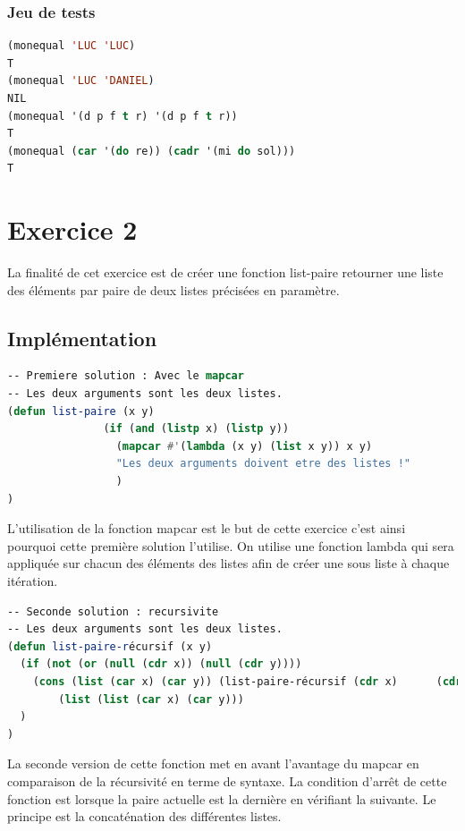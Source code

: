 \documentclass[a4paper,10pt]{report}
\begin{document}
	  \subsection{Jeu de tests}
	  \begin{lstlisting}[language=Lisp]
(monequal 'LUC 'LUC)
T
(monequal 'LUC 'DANIEL)
NIL
(monequal '(d p f t r) '(d p f t r))
T
(monequal (car '(do re)) (cadr '(mi do sol)))
T

		 \end{lstlisting}
	  \chapter{Exercice 2}
	  
	  
	    La finalité de cet exercice est de créer une fonction list-paire retourner une liste des éléments par paire de deux listes précisées en paramètre.
	  \section{Implémentation}
	  \begin{lstlisting}[language=Lisp]
-- Premiere solution : Avec le mapcar
-- Les deux arguments sont les deux listes.
(defun list-paire (x y)
               (if (and (listp x) (listp y))
                 (mapcar #'(lambda (x y) (list x y)) x y)
                 "Les deux arguments doivent etre des listes !"
                 )
)
	  \end{lstlisting}

	  L’utilisation de la fonction mapcar est le but de cette exercice c’est ainsi pourquoi cette première solution l’utilise. On utilise une fonction lambda qui sera appliquée sur chacun des éléments des listes afin de créer une sous liste à chaque itération.
	  
	    \begin{lstlisting}[language=Lisp]
-- Seconde solution : recursivite
-- Les deux arguments sont les deux listes.
(defun list-paire-récursif (x y)
  (if (not (or (null (cdr x)) (null (cdr y))))
  	(cons (list (car x) (car y)) (list-paire-récursif (cdr x)      (cdr y)))
     	(list (list (car x) (car y)))
  )
)
	  \end{lstlisting}
	  
La seconde version de cette fonction met en avant l’avantage du mapcar en comparaison de la récursivité en terme de syntaxe. La condition d’arrêt de cette fonction est lorsque la paire actuelle est la dernière en vérifiant la suivante. Le principe est la concaténation des différentes listes. \newpage
\end{document}
